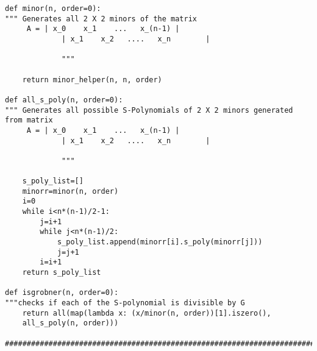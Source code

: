 \documentclass[12pt,a4paper]{article}
\theoremstyle{definition}
\begin{document}
\begin{verbatim}
def minor(n, order=0):
""" Generates all 2 X 2 minors of the matrix
     A = | x_0    x_1    ...   x_(n-1) |
             | x_1    x_2   ....   x_n        |
             
             """
    
    return minor_helper(n, n, order)

def all_s_poly(n, order=0):  
""" Generates all possible S-Polynomials of 2 X 2 minors generated from matrix
     A = | x_0    x_1    ...   x_(n-1) |
             | x_1    x_2   ....   x_n        |
             
             """

    s_poly_list=[]
    minorr=minor(n, order)
    i=0
    while i<n*(n-1)/2-1:
        j=i+1
        while j<n*(n-1)/2:
            s_poly_list.append(minorr[i].s_poly(minorr[j]))
            j=j+1
        i=i+1
    return s_poly_list

def isgrobner(n, order=0):
"""checks if each of the S-polynomial is divisible by G 
    return all(map(lambda x: (x/minor(n, order))[1].iszero(), 
    all_s_poly(n, order)))

############################################################################
\end{verbatim}

\end{document}
